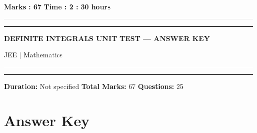 \documentclass[11pt,a4paper]{article}
\begin{document}
\vspace{2mm}
\noindent \textbf{Marks : 67} \hfill \textbf{Time : 2 : 30 hours}
\noindent\rule{\linewidth}{1.1pt}\vspace{-1mm}\noindent\rule{\linewidth}{0.5pt}
{\centering \Large \textbf{DEFINITE INTEGRALS UNIT TEST --- ANSWER KEY}\par}
{\centering JEE $|$ Mathematics\par}
\noindent\rule{\linewidth}{1.1pt}\vspace{-1mm}\noindent\rule{\linewidth}{0.5pt}
\vspace{1mm}
\noindent \textbf{Duration:} Not specified \quad \textbf{Total Marks:} 67 \quad \textbf{Questions:} 25\par
\vspace{2mm}

\section*{Answer Key}
\end{document}
